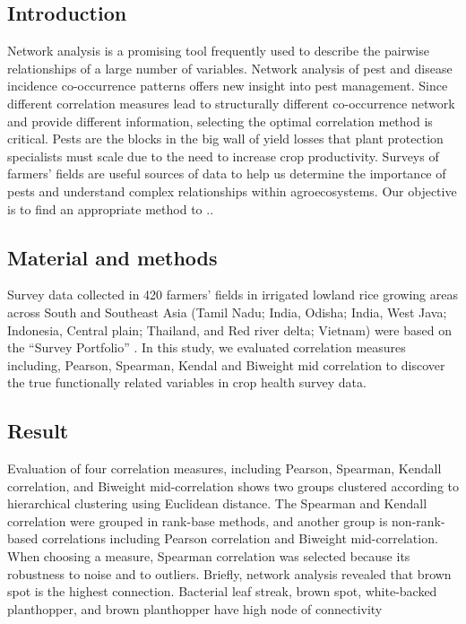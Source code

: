 
\subsection*{Introduction}

Network analysis is a promising tool frequently used to describe the pairwise relationships of a large number of variables. Network analysis of pest and disease incidence co-occurrence patterns offers new insight into pest management. Since different correlation measures lead to structurally different co-occurrence network and provide different information, selecting the optimal correlation method is critical. Pests are the blocks in the big wall of yield losses that plant protection specialists must scale due to the need to increase crop productivity. Surveys of farmers’ fields are useful sources of data to help us determine the importance of pests and understand complex relationships within agroecosystems. Our objective is to find an appropriate method to ..

% 

\subsection*{Material and methods}
Survey data collected in 420 farmers’ fields in irrigated lowland rice growing areas across South and Southeast Asia (Tamil Nadu; India, Odisha; India, West Java; Indonesia, Central plain; Thailand, and Red river delta; Vietnam) were based on the “Survey Portfolio” . In this study, we evaluated correlation measures including, Pearson, Spearman, Kendal and Biweight mid correlation to discover the true functionally related variables in crop health survey data.

\subsection*{Result}
Evaluation of four correlation measures, including Pearson, Spearman, Kendall correlation, and Biweight mid-correlation shows two groups clustered according to hierarchical clustering using Euclidean distance. The Spearman and Kendall correlation were grouped in rank-base methods, and another group is non-rank-based correlations including Pearson correlation and Biweight mid-correlation. When choosing a measure, Spearman correlation was selected because its robustness to noise and to outliers.
Briefly, network analysis revealed that brown spot is the highest connection. Bacterial leaf streak, brown spot, white-backed planthopper, and brown planthopper have high node of connectivity

